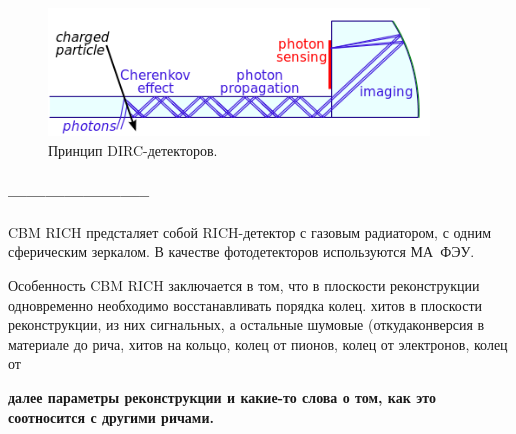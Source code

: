 \begin{figure}[H]
\includegraphics[width=0.9\textwidth]{pictures/DIRC.png}
\caption{Принцип DIRC-детекторов.}
\label{fig:DIRC}
\end{figure}

\subsubsection{-----------------------}

CBM RICH предсталяет собой RICH-детектор с газовым радиатором, с одним сферическим зеркалом. В качестве фотодетекторов используются МА~ФЭУ.

Особенность CBM RICH заключается в том, что в плоскости реконструкции одновременно необходимо восстанавливать порядка \todo колец. 
\todo хитов в плоскости реконструкции, из них \todo сигнальных, а остальные шумовые (откуда\todo конверсия в материале до рича\todo , \todo хитов на кольцо, \todo колец от пионов, \todo колец от электронов, \todo колец от \todo

\todo \textbf{далее параметры реконструкции и какие-то слова о том, как это соотносится с другими ричами.}




